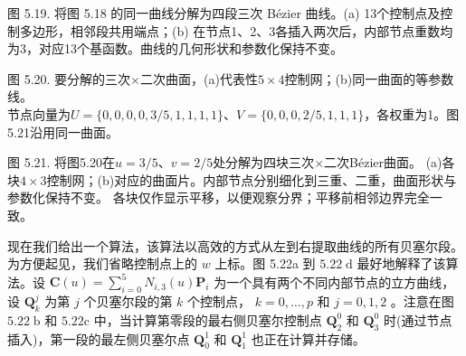 \documentclass[../main.tex]{subfiles}
\begin{document}
\begin{center}
\begin{minipage}{18cm}
\vspace*{.6\baselineskip}
\centering
{}
\par\smallskip
图 5.19. 将图 5.18 的同一曲线分解为四段三次 Bézier 曲线。(a) 13个控制点及控制多边形，相邻段共用端点；(b) 在节点1、2、3各插入两次后，内部节点重数均为3，对应13个基函数。曲线的几何形状和参数化保持不变。
\end{minipage}
\end{center}



\begin{center}
\begin{minipage}{28cm}
\vspace*{.6\baselineskip}
\centering
{}
\par\smallskip
图 5.20. 要分解的三次$\times$二次曲面，(a)代表性$5\times4$控制网；(b)同一曲面的等参数线。\\
节点向量为$U=\{0,0,0,0,3/5,1,1,1,1\}$、$V=\{0,0,0,2/5,1,1,1\}$，各权重为1。图5.21沿用同一曲面。
\end{minipage}
\end{center}

\begin{center}
\begin{minipage}{28cm}
\vspace*{.6\baselineskip}
\centering
\begin{minipage}[b]{13cm}
\end{minipage}\hfill
\begin{minipage}[b]{13cm}
\end{minipage}
\par\smallskip
图 5.21. 将图5.20在$u=3/5$、$v=2/5$处分解为四块三次$\times$二次Bézier曲面。
(a)各块$4\times3$控制网；(b)对应的曲面片。内部节点分别细化到三重、二重，曲面形状与参数化保持不变。
各块仅作显示平移，以便观察分界；平移前相邻边界完全一致。
\end{minipage}
\end{center}

现在我们给出一个算法，该算法以高效的方式从左到右提取曲线的所有贝塞尔段。为方便起见，我们省略控制点上的 \(w\) 上标。图 5.22a 到 \({5.22}\mathrm{\;d}\) 最好地解释了该算法。设 \(\mathbf{C}\left( u\right)  = \mathop{\sum }\limits_{{i = 0}}^{5}{N}_{i,3}\left( u\right) {\mathbf{P}}_{i}\) 为一个具有两个不同内部节点的立方曲线，设 \({\mathbf{Q}}_{k}^{j}\) 为第 \(j\) 个贝塞尔段的第 \(k\) 个控制点， \(k = 0,\ldots ,p\) 和 \(j = 0,1,2\) 。注意在图 \({5.22}\mathrm{\;b}\) 和 \({5.22}\mathrm{c}\) 中，当计算第零段的最右侧贝塞尔控制点 \({\mathbf{Q}}_{2}^{0}\) 和 \({\mathbf{Q}}_{3}^{0}\) 时(通过节点插入)，第一段的最左侧贝塞尔点 \({\mathbf{Q}}_{0}^{1}\) 和 \({\mathbf{Q}}_{1}^{1}\) 也正在计算并存储。
\end{document}
